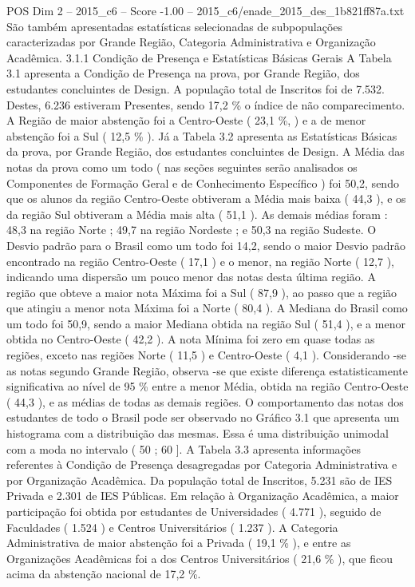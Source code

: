 \begin{textsample}{POS Dim 2 – 2015\_c6 – Score -1.00 – 2015\_c6/enade\_2015\_des\_1b821ff87a.txt}
São também apresentadas estatísticas selecionadas de subpopulações caracterizadas por Grande Região, Categoria Administrativa e Organização Acadêmica. 3.1.1 Condição de Presença e Estatísticas Básicas Gerais A Tabela 3.1 apresenta a Condição de Presença na prova, por Grande Região, dos estudantes concluintes de Design.
A população total de Inscritos foi de 7.532.
Destes, 6.236 estiveram Presentes, sendo 17,2 \% o índice de não comparecimento.
A Região de maior abstenção foi a Centro-Oeste ( 23,1 \%, ) e a de menor abstenção foi a Sul ( 12,5 \% ).
Já a Tabela 3.2 apresenta as Estatísticas Básicas da prova, por Grande Região, dos estudantes concluintes de Design.
A Média das notas da prova como um todo ( nas seções seguintes serão analisados os Componentes de Formação Geral e de Conhecimento Específico ) foi 50,2, sendo que os alunos da região Centro-Oeste obtiveram a Média mais baixa ( 44,3 ), e os da região Sul obtiveram a Média mais alta ( 51,1 ).
As demais médias foram : 48,3 na região Norte ; 49,7 na região Nordeste ; e 50,3 na região Sudeste.
O Desvio padrão para o Brasil como um todo foi 14,2, sendo o maior Desvio padrão encontrado na região Centro-Oeste ( 17,1 ) e o menor, na região Norte ( 12,7 ), indicando uma dispersão um pouco menor das notas desta última região.
A região que obteve a maior nota Máxima foi a Sul ( 87,9 ), ao passo que a região que atingiu a menor nota Máxima foi a Norte ( 80,4 ).
A Mediana do Brasil como um todo foi 50,9, sendo a maior Mediana obtida na região Sul ( 51,4 ), e a menor obtida no Centro-Oeste ( 42,2 ).
A nota Mínima foi zero em quase todas as regiões, exceto nas regiões Norte ( 11,5 ) e Centro-Oeste ( 4,1 ).
Considerando -se as notas segundo Grande Região, observa -se que existe diferença estatisticamente significativa ao nível de 95 \% entre a menor Média, obtida na região Centro-Oeste ( 44,3 ), e as médias de todas as demais regiões.
O comportamento das notas dos estudantes de todo o Brasil pode ser observado no Gráfico 3.1 que apresenta um histograma com a distribuição das mesmas.
Essa é uma distribuição unimodal com a moda no intervalo ( 50 ; 60 ].
A Tabela 3.3 apresenta informações referentes à Condição de Presença desagregadas por Categoria Administrativa e por Organização Acadêmica.
Da população total de Inscritos, 5.231 são de IES Privada e 2.301 de IES Públicas.
Em relação à Organização Acadêmica, a maior participação foi obtida por estudantes de Universidades ( 4.771 ), seguido de Faculdades ( 1.524 ) e Centros Universitários ( 1.237 ).
A Categoria Administrativa de maior abstenção foi a Privada ( 19,1 \% ), e entre as Organizações Acadêmicas foi a dos Centros Universitários ( 21,6 \% ), que ficou acima da abstenção nacional de 17,2 \%.

\end{textsample}
